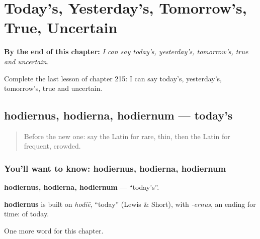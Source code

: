
\chapter{Today's, Yesterday's, Tomorrow's, True, Uncertain}
\label{ch:la-today-s-yesterday-s-tomorrow-s-true-uncertain}

\begin{chapteropening}
\textbf{By the end of this chapter:} \emph{I can say today's, yesterday's, tomorrow's, true and uncertain.}

Complete the last lesson of chapter 215: I can say today's, yesterday's, tomorrow's, true and uncertain.
\end{chapteropening}

\section[hodiernus, hodierna, hodiernum]{hodiernus, hodierna, hodiernum — today's}

\label{lesson:LA-C215-hodiernus}



\begin{quote}
Before the new one: say the Latin for rare, thin, then the Latin for frequent, crowded.
\end{quote}

\subsection*{You'll want to know: hodiernus, hodierna, hodiernum}
\textbf{hodiernus, hodierna, hodiernum} — \textquotedblleft{}today's\textquotedblright{}.

\begin{cousinweb}
\textbf{hodiernus} is built on \emph{hodiē}, \textquotedblleft{}today\textquotedblright{} (Lewis \& Short), with \emph{-ernus}, an ending for time: of today.
\end{cousinweb}

\begin{grammarlens}[title={What you've built}]
One more word for this chapter.
\end{grammarlens}

